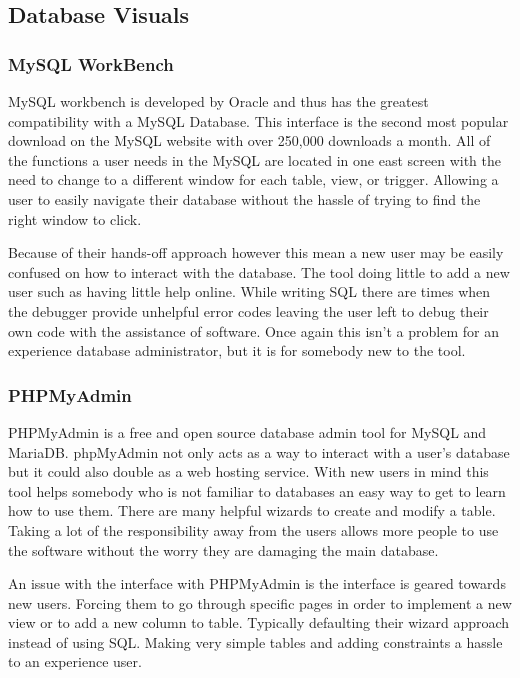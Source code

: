 \documentclass[onecolumn, draftclsnofoot,10pt, compsoc]{IEEEtran}
\begin{document}
\subsection{Database Visuals}
\subsubsection{MySQL WorkBench}

MySQL workbench is developed by Oracle and thus has the greatest compatibility with a MySQL Database. This interface is the second most popular download on the MySQL website with over 250,000 downloads a month. All of the functions a user needs in the MySQL are located in one east screen with the need to change to a different window for each table, view, or trigger. Allowing a user to easily navigate their database without the hassle of trying to find the right window to click.

Because of their hands-off approach however this mean a new user may be easily confused on how to interact with the database. The tool doing little to add a new user such as having little help online. While writing SQL there are times when the debugger provide unhelpful error codes leaving the user left to debug their own code with the assistance of software. Once again this isn’t a problem for an experience database administrator, but it is for somebody new to the tool. 

\subsubsection{PHPMyAdmin}

PHPMyAdmin is a free and open source database admin tool for MySQL and MariaDB. phpMyAdmin not only acts as a way to interact with a user’s database but it could also double as a web hosting service. With new users in mind this tool helps somebody who is not familiar to databases an easy way to get to learn how to use them. There are many helpful wizards to create and modify a table. Taking a lot of the responsibility away from the users allows more people to use the software without the worry they are damaging the main database. 

An issue with the interface with PHPMyAdmin is the interface is geared towards new users. Forcing them to go through specific pages in order to implement a new view or to add a new column to table. Typically defaulting their wizard approach instead of using SQL. Making very simple tables and adding constraints a hassle to an experience user.  
\end{document}
